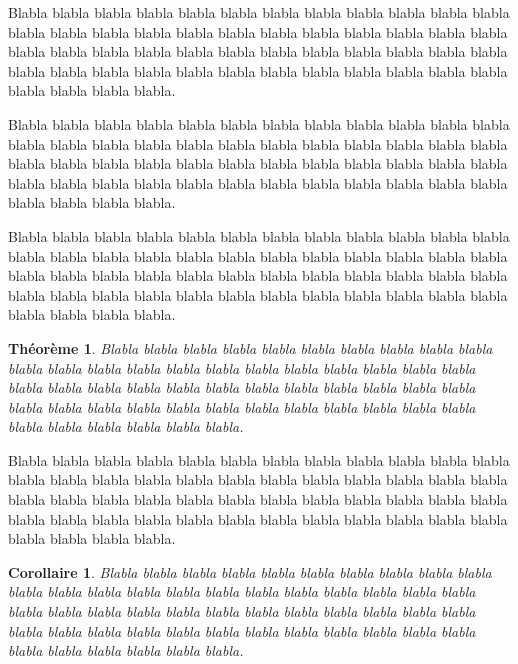 \documentclass[a4paper]{article}
\newtheorem{theoreme}{Théorème}[section]
\newtheorem{corollaire}{Corollaire}
\begin{document}
Blabla blabla blabla blabla blabla blabla blabla blabla blabla blabla blabla blabla blabla
blabla blabla blabla blabla blabla blabla blabla blabla blabla blabla blabla blabla blabla
blabla blabla blabla blabla blabla blabla blabla blabla blabla blabla blabla blabla blabla
blabla blabla blabla blabla blabla blabla blabla blabla blabla blabla blabla blabla blabla.


Blabla blabla blabla blabla blabla blabla blabla blabla blabla blabla blabla blabla blabla
blabla blabla blabla blabla blabla blabla blabla blabla blabla blabla blabla blabla blabla
blabla blabla blabla blabla blabla blabla blabla blabla blabla blabla blabla blabla blabla
blabla blabla blabla blabla blabla blabla blabla blabla blabla blabla blabla blabla blabla.


Blabla blabla blabla blabla blabla blabla blabla blabla blabla blabla blabla blabla blabla
blabla blabla blabla blabla blabla blabla blabla blabla blabla blabla blabla blabla blabla
blabla blabla blabla blabla blabla blabla blabla blabla blabla blabla blabla blabla blabla
blabla blabla blabla blabla blabla blabla blabla blabla blabla blabla blabla blabla blabla.

\begin{theoreme}\label{ici}
Blabla blabla blabla blabla blabla blabla blabla blabla blabla blabla blabla blabla blabla
blabla blabla blabla blabla blabla blabla blabla blabla blabla blabla blabla blabla blabla
blabla blabla blabla blabla blabla blabla blabla blabla blabla blabla blabla blabla blabla
blabla blabla blabla blabla blabla blabla blabla blabla blabla blabla blabla blabla blabla.
\end{theoreme}

Blabla blabla blabla blabla blabla blabla blabla blabla blabla blabla blabla blabla blabla
blabla blabla blabla blabla blabla blabla blabla blabla blabla blabla blabla blabla blabla
blabla blabla blabla blabla blabla blabla blabla blabla blabla blabla blabla blabla blabla
blabla blabla blabla blabla blabla blabla blabla blabla blabla blabla blabla blabla blabla.

\begin{corollaire}
Blabla blabla blabla blabla blabla blabla blabla blabla blabla blabla blabla blabla blabla
blabla blabla blabla blabla blabla blabla blabla blabla blabla blabla blabla blabla blabla
blabla blabla blabla blabla blabla blabla blabla blabla blabla blabla blabla blabla blabla
blabla blabla blabla blabla blabla blabla blabla blabla blabla blabla blabla blabla blabla.
\end{corollaire}
\end{document}
